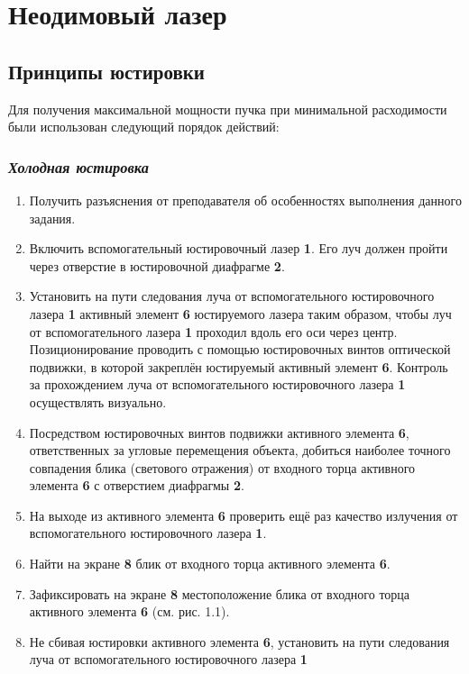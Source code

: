 \documentclass[twocolumn]{article}
\begin{document}
\section{Неодимовый лазер}
\subsection{Принципы юстировки}Для получения максимальной мощности пучка при минимальной расходимости
были использован следующий порядок действий:\subsubsection{\emph{Холодная юстировка}}\begin{enumerate}
\def\labelenumi{\arabic{enumi}.}
\item
  Получить разъяснения от преподавателя об особенностях выполнения
  данного задания.
\item
  Включить вспомогательный юстировочный лазер \textbf{1}. Его луч должен
  пройти через отверстие в юстировочной диафрагме \textbf{2}.
\item
  Установить на пути следования луча от вспомогательного юстировочного
  лазера \textbf{1} активный элемент \textbf{6} юстируемого лазера таким
  образом, чтобы луч от вспомогательного лазера \textbf{1} проходил
  вдоль его оси через центр. Позиционирование проводить с помощью
  юстировочных винтов оптической подвижки, в которой закреплён
  юстируемый активный элемент \textbf{6}. Контроль за прохождением луча
  от вспомогательного юстировочного лазера \textbf{1} осуществлять
  визуально.
\item
  Посредством юстировочных винтов подвижки активного элемента
  \textbf{6}, ответственных за угловые перемещения объекта, добиться
  наиболее точного совпадения блика (светового отражения) от входного
  торца активного элемента \textbf{6} с отверстием диафрагмы \textbf{2}.
\item
  На выходе из активного элемента \textbf{6} проверить ещё раз качество
  излучения от вспомогательного юстировочного лазера \textbf{1}.
\item
  Найти на экране \textbf{8} блик от входного торца активного элемента
  \textbf{6}.
\item
  Зафиксировать на экране \textbf{8} местоположение блика от входного
  торца активного элемента \textbf{6} (см. рис. 1.1).
\item
  Не сбивая юстировки активного элемента \textbf{6}, установить на пути
  следования луча от вспомогательного юстировочного лазера \textbf{1}

\end{enumerate}
\end{document}
